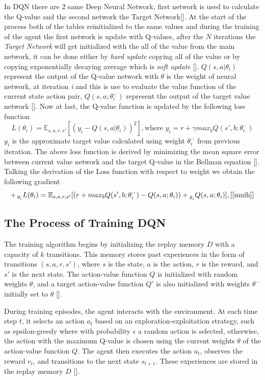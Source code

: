 \documentclass[12pt]{article}
\begin{document}
In DQN there are 2 same Deep Neural Network, first network is used to calculate the Q-value and the second network the Target Network[\cite{jia}]. At the start of the process both of the tables reinitialized to the same values and during the training of the agent the first network is update with Q-values, after the $N$ iterations the \textit{Target Network} will get initialized with the all of the value from the main network, it can be done either by \textit{hard update} copying all of the value or by copying exponentially decaying average which is \textit{soft update} [\cite{zhang}]. $Q(s,a|\theta_i)$ represent the output of the Q-value network with $\theta$ is the weight of neural network, at iteration \textit{i} and this is use to evaluate the value function of the current state action pair, $Q(s,a; \theta^-_i)$ represent the output of the target value network [\cite{jia}]. Now at last, the Q-value function is updated by the following loss function $$L(\theta_i) = \mathbb{E}_{s,a,r,s'}[(y_i - Q(s,a|\theta_i))^2], \text{where } y_i = r + \gamma max_{b}Q(s',b; \theta^-_i)$$ $y_i$ is the approximate target value calculated using weight $\theta_i^-$ from previous iteration. The above loss function is derived by minimizing the mean square error between current value network and the target Q-value in the Bellman equation [\cite{mnih}]. Talking the derivation of the Loss function with respect to weight we obtain the following gradient $$+\prescript{}{\theta_i}{L}(\theta_i) = \mathbb{E}_{s,a,r,s'}[(r + max_{b}Q(s',b;\theta^-_i) - Q(s,a;\theta_i)) + \prescript{}{\theta_i}{Q(s,a;\theta_i)}], [\cite{mnih}]$$

\subsection{The Process of Training DQN}

The training algorithm begins by initializing the replay memory $D$ with a capacity of $k$ transitions. This memory stores past experiences in the form of transitions $(s, a, r, s')$, where $s$ is the state, $a$ is the action, $r$ is the reward, and $s'$ is the next state. The action-value function $Q$ is initialized with random weights $\theta$, and a target action-value function $Q'$ is also initialized with weights $\theta^-$ initially set to $\theta$ [\cite{mnih}].

During training episodes, the agent interacts with the environment. At each time step $t$, it selects an action $a_t$ based on an exploration-exploitation strategy, such as epsilon-greedy where with probability $\epsilon$ a random action is selected, otherwise, the action with the maximum Q-value is chosen using the current weights $\theta$ of the action-value function $Q$. The agent then executes the action $a_t$, observes the reward $r_t$, and transitions to the next state $s_{t+1}$. These experiences are stored in the replay memory $D$ [\cite{mnih}].
\end{document}
